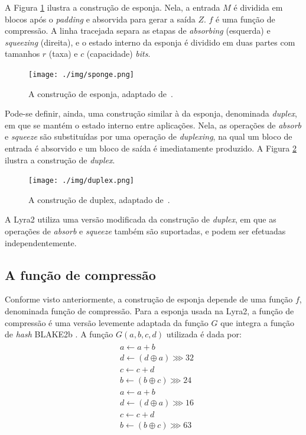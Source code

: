 \documentclass{article}
\begin{document}
A Figura \ref{img-sponge} ilustra a construção de esponja. Nela, a
entrada $M$ é dividida em blocos após o \emph{padding} e absorvida
para gerar a saída $Z$. $f$ é uma função de compressão. A linha
tracejada separa as etapas de \emph{absorbing} (esquerda) e
\emph{squeezing} (direita), e o estado interno da esponja é dividido em
duas partes com tamanhos $r$ (taxa) e $c$ (capacidade)
\emph{bits}.

\begin{figure}[htbp]
\centering
\texttt{[image: ./img/sponge.png]}
\caption{A construção de esponja, adaptado de~\cite{sponge}.\label{img-sponge}}
\end{figure}

Pode-se definir, ainda, uma construção similar à da esponja, denominada
\emph{duplex}, em que se mantém o estado interno entre aplicações. Nela,
as operações de \emph{absorb} e \emph{squeeze} são substituídas por uma
operação de \emph{duplexing}, na qual um bloco de entrada é absorvido e
um bloco de saída é imediatamente produzido. A Figura \ref{img-duplex}
ilustra a construção de \emph{duplex}.

\begin{figure}[htbp]
\centering
\texttt{[image: ./img/duplex.png]}
\caption{A construção de duplex, adaptado de~\cite{sponge}.\label{img-duplex}}
\end{figure}

A Lyra2 utiliza uma versão modificada da construção de \emph{duplex}, em
que as operações de \emph{absorb} e \emph{squeeze} também são
suportadas, e podem ser efetuadas independentemente.

\subsection{A função de compressão}\label{sec-compression-fn}

Conforme visto anteriormente, a construção de esponja depende de uma
função $f$, denominada função de compressão. Para a esponja usada na
Lyra2, a função de compressão é uma versão levemente adaptada da função
$G$ que integra a função de \emph{hash} BLAKE2b \cite{blake2b} . A função
$G(a, b, c, d)$ utilizada é dada por:
\begin{align*}
\begin{split}
& a \leftarrow a + b \\
& d \leftarrow \left(d \oplus a \right) \ggg 32 \\
& c \leftarrow c + d \\
& b \leftarrow \left(b \oplus c \right) \ggg 24 \\
& a \leftarrow a + b \\
& d \leftarrow \left(d \oplus a \right) \ggg 16 \\
& c \leftarrow c + d \\
& b \leftarrow \left(b \oplus c \right) \ggg 63
\end{split}
\end{align*}
\end{document}
